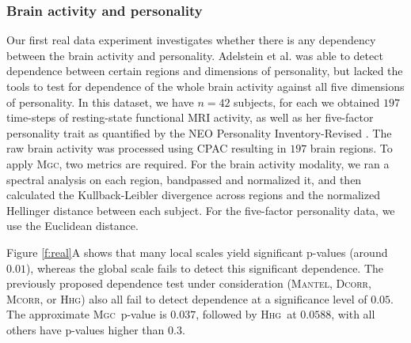 \documentclass[11pt]{article}
\newcommand{\note}[2][]{\added[#1,remark={#2}]{}}
\providecommand{\sct}[1]{{\normalfont\textsc{#1}}}
\newcommand{\Mgc}{\sct{Mgc}}
\newcommand{\Hhg}{\sct{Hhg}}
\newcommand{\Dcorr}{\sct{Dcorr}}
\newcommand{\Mcorr}{\sct{Mcorr}}
\newcommand{\Mantel}{\sct{Mantel}}
\newcommand{\cs}[1]{{\note{cs: #1}}}
\begin{document}
\subsubsection*{Brain activity and personality} %
\cs{need change here: add p-value, polish CxP, add noise and show p-value map for brain disease; figure and caption update}

Our first real data experiment investigates whether there is any dependency between the brain activity and personality.
Adelstein et al. \cite{AdelsteinEtAl2011} was able to detect dependence between certain regions and dimensions of personality, but lacked the tools to test for dependence of the whole brain activity against all five dimensions of personality. 
In this dataset, we have $n=42$ subjects, for each we obtained  $197$ time-steps of resting-state functional MRI activity, as well as her five-factor personality trait as quantified by  the NEO Personality Inventory-Revised  \cite{Costa1992}. 
The raw brain activity was processed using CPAC \cite{CPAC} resulting in $197$ brain regions.
To apply \Mgc, two metrics are required. For the brain activity modality, we ran a spectral analysis on each region, bandpassed and normalized it, and then calculated the Kullback-Leibler divergence across regions and the normalized Hellinger distance between each subject. 
For the five-factor personality data, we  use the Euclidean distance.




Figure \ref{f:real}A  shows that many local scales yield significant p-values (around $0.01$), whereas the global scale fails to detect this significant dependence. The previously proposed dependence test under consideration (\Mantel, \Dcorr, \Mcorr, or \Hhg) also all fail to detect dependence at a significance level of $0.05$. The approximate \Mgc~p-value is $0.037$, followed by \Hhg~at $0.0588$, with all others have p-values higher than $0.3$.
\end{document}
